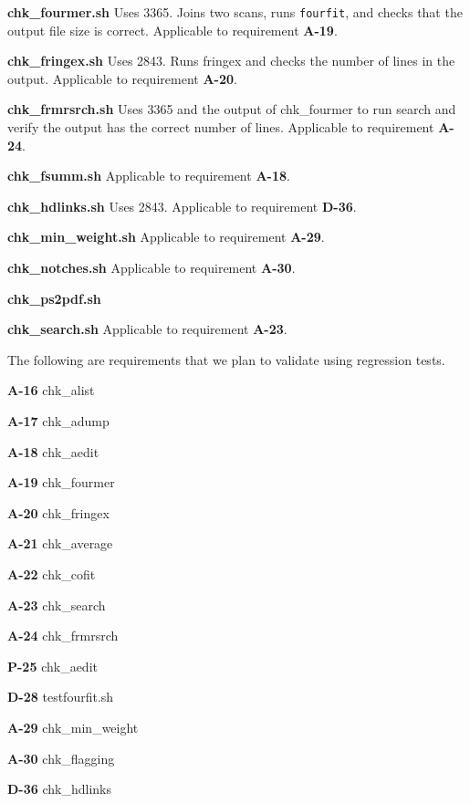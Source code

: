 \begin{description}
\item{\textbf{chk\_fourmer.sh}} Uses 3365. Joins two scans, runs \texttt{fourfit}, and checks that the output file size is correct. Applicable to requirement \textbf{A-19}.
\item{\textbf{chk\_fringex.sh}} Uses 2843. Runs fringex and checks the number of lines in the output. Applicable to requirement \textbf{A-20}.
\item{\textbf{chk\_frmrsrch.sh}} Uses 3365 and the output of chk\_fourmer to run search and verify the output has the correct number of lines. Applicable to requirement \textbf{A-24}.
\item{\textbf{chk\_fsumm.sh}} Applicable to requirement \textbf{A-18}.
\item{\textbf{chk\_hdlinks.sh}} Uses 2843. Applicable to requirement \textbf{D-36}.
\item{\textbf{chk\_min\_weight.sh}} Applicable to requirement \textbf{A-29}.
\item{\textbf{chk\_notches.sh}} Applicable to requirement \textbf{A-30}.
\item{\textbf{chk\_ps2pdf.sh}}
\item{\textbf{chk\_search.sh}} Applicable to requirement \textbf{A-23}.
  
\end{description}




The following are requirements that we plan to validate using regression tests. 

\begin{description}

\item{\textbf{A-16}} chk\_alist
\item{\textbf{A-17}} chk\_adump
\item{\textbf{A-18}} chk\_aedit
\item{\textbf{A-19}} chk\_fourmer
\item{\textbf{A-20}} chk\_fringex
\item{\textbf{A-21}} chk\_average
\item{\textbf{A-22}} chk\_cofit
\item{\textbf{A-23}} chk\_search
\item{\textbf{A-24}} chk\_frmrsrch
\item{\textbf{P-25}} chk\_aedit

\item{\textbf{D-28}} testfourfit.sh 
  
\item{\textbf{A-29}} chk\_min\_weight  
\item{\textbf{A-30}} chk\_flagging

\item{\textbf{D-36}} chk\_hdlinks

\end{description}
  


